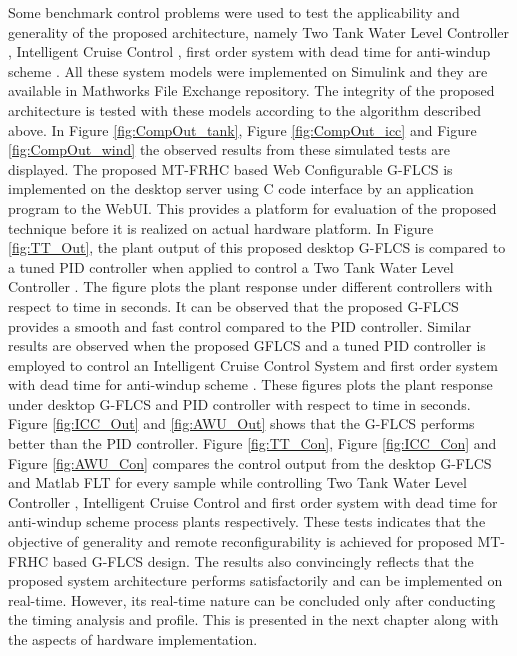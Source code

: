 Some benchmark control problems were used to test the applicability and generality of the proposed architecture, namely Two Tank Water Level Controller \cite{twotank2012,Laubwald2006}, Intelligent Cruise Control \cite{Naranjo2003}, first order system with dead time for anti-windup scheme \cite{antiwindup2014}. All these system models were implemented on Simulink and they are available in Mathworks File Exchange repository. The integrity of the proposed architecture is tested with these models according to the algorithm described above. In Figure \ref{fig:CompOut_tank}, Figure \ref{fig:CompOut_icc} and Figure \ref{fig:CompOut_wind} the observed results from these simulated tests are displayed. The proposed MT-FRHC based Web Configurable G-FLCS is implemented on the desktop server using C code interface by an application program to the WebUI. This provides a platform for evaluation of the proposed technique before it is realized on actual hardware platform. In Figure \ref{fig:TT_Out}, the plant output of this proposed desktop G-FLCS is compared to a tuned PID controller when applied to control a Two Tank Water Level Controller \cite{twotank2012,Laubwald2006}. The figure plots the plant response under different controllers with respect to time in seconds. It can be observed that the proposed G-FLCS provides a smooth and fast control compared to the PID controller. Similar results are observed when the proposed GFLCS and a tuned PID controller is employed to control an Intelligent Cruise Control System\cite{Naranjo2003} and first order system with dead time for anti-windup scheme \cite{antiwindup2014}. These figures plots the plant response under desktop G-FLCS and PID controller with respect to time in seconds. Figure \ref{fig:ICC_Out} and \ref{fig:AWU_Out} shows that the G-FLCS performs better than the PID controller. Figure \ref{fig:TT_Con}, Figure \ref{fig:ICC_Con} and Figure \ref{fig:AWU_Con} compares the control output from the desktop G-FLCS and Matlab FLT for every sample while controlling Two Tank Water Level Controller \cite{twotank2012,Laubwald2006}, Intelligent Cruise Control \cite{Naranjo2003} and first order system with dead time for anti-windup scheme \cite{antiwindup2014} process plants respectively. These tests indicates that the objective of generality and remote reconfigurability is achieved for proposed MT-FRHC based G-FLCS design. The results also convincingly reflects that the proposed system architecture performs satisfactorily and can be implemented on real-time. However, its real-time nature can be concluded only after conducting the timing analysis and profile. This is presented in the next chapter along with the aspects of hardware implementation.

